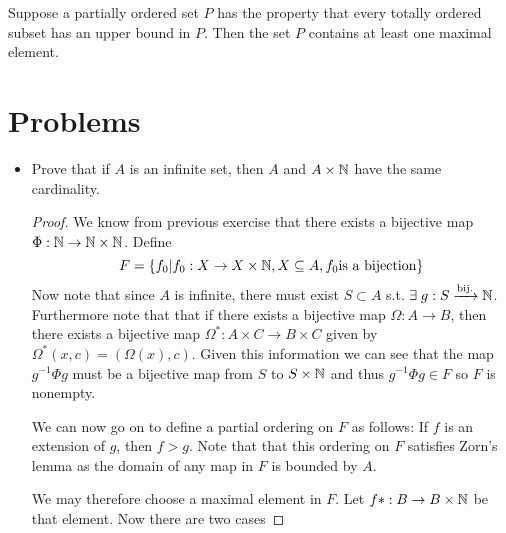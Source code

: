 

\begin{lemma}
 Suppose a partially ordered set $P$ has the property that every totally ordered subset has an upper bound in $P$. Then the set $P$ contains at least one maximal element.
\section{Problems}
\begin{itemize}
\item Prove that if $A$ is an infinite set, then $A$ and $A\times \mathbb{N}$ have the same cardinality.
\begin{proof}
We know from previous exercise that there exists a bijective map $\Phi: \mathbb{N}\to\mathbb{N}\times\mathbb{N}$. Define
\[ F = \{ f_0 | f_0:X\to X\times\mathbb{N}, X\subseteq A, f_0 \text{is a bijection}\}\]
Now note that since $A$ is infinite, there must exist $S\subset A$ s.t. $\exists\; g:S\xrightarrow{\text{bij.}}\mathbb{N}$. 
Furthermore note that that if there exists a bijective map  $\Omega: A\to B$, then there exists a bijective map $\Omega^*:A\times C\to B\times C$ given by 
$\Omega^*(x,c)=(\Omega(x),c)$. Given this information we can see that the map $g^{-1}\Phi g$ must be a bijective map from $S$ to $S\times \mathbb{N}$ and thus  $g^{-1}\Phi g\in F$ so $F$ is nonempty.

We can now go on to define a partial ordering on $F$ as follows: If $f$ is an extension of $g$, then $f>g$. Note that that this ordering on $F$ satisfies Zorn's lemma as the domain of any map in $F$ is bounded by $A$.

We may therefore choose a maximal element in $F$. Let  $f*: B\to B\times \mathbb{N}$ be that element. Now there are two cases

\end{proof}
\end{itemize}
\end{lemma}

